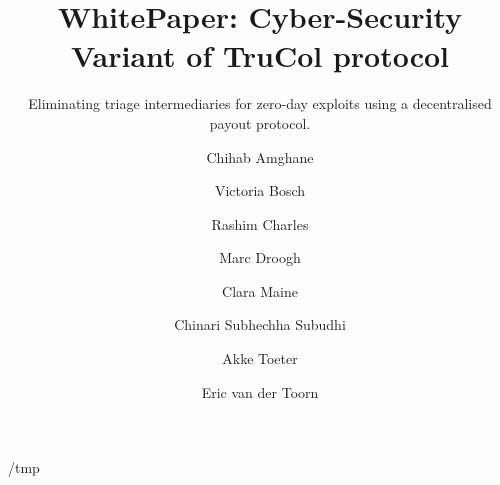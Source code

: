 \documentclass[a4paper, UKenglish, cleveref, autoref, thm-restate]{lipics-v2021}
\title{WhitePaper: Cyber-Security Variant of TruCol protocol} %
\subtitle{Eliminating triage intermediaries for zero-day exploits using a decentralised payout protocol.}
\author{Chihab Amghane}{Radboud University}%
{}{}{(Optional) author-specific funding acknowledgements}%
\author{Victoria Bosch}{Radboud University}%
{}{}{}%
\author{Rashim Charles}{Radboud University}%
{}{}{}%
\author{Marc Droogh}{Delft University of Technology}%
{}{}{}%
\author{Clara Maine}{Radboud University}%
{}{}{}%
\author{Chinari Subhechha Subudhi}{Delft University of Technology}%
{}{}{}%
\author{Akke Toeter}{Delft University of Technology, Radboud University}%
{a.h.h.toeter@student.tudelft.nl}{0000-0002-9577-920X}{}%
\author{Eric van der Toorn}{Delft University of Technology}%
{}{}{}%
\def\overleafhome{/tmp}%
\begin{document}
\maketitle

\ifx\homepath\overleafhome
    
    
    
    
    
\else
    
    
    
    
    
\fi
%
 


 
\end{document}
